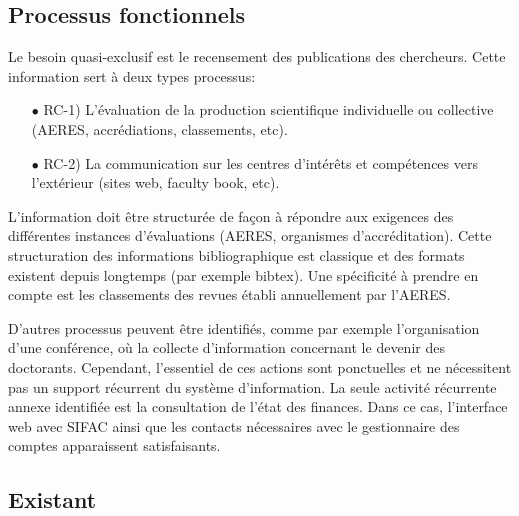 \documentclass{book}
\begin{document}
\subsection{Processus fonctionnels}

Le besoin quasi-exclusif est le recensement des publications des chercheurs.
Cette information sert à deux types processus:
\begin{itemize}
\item[$\bullet$] RC-1) L'évaluation de la production scientifique individuelle ou 
collective (AERES, accrédiations, classements, etc).
\item[$\bullet$] RC-2) La communication sur les centres d'intérêts et compétences 
vers l'extérieur (sites web, faculty book, etc).
\end{itemize}

\bigskip
L'information doit être structurée de façon à répondre aux exigences des 
différentes instances d'évaluations (AERES, organismes d'accréditation).
Cette structuration des informations bibliographique est classique et des
formats existent depuis longtemps (par exemple bibtex). Une spécificité
à prendre en compte est les classements des revues établi annuellement par 
l'AERES.

D'autres processus peuvent être identifiés, comme par exemple l'organisation
d'une conférence, où la collecte d'information concernant le devenir des
doctorants. Cependant, l'essentiel de ces actions sont ponctuelles et ne 
nécessitent pas un support récurrent du système d'information. La seule 
activité récurrente annexe identifiée est la consultation de l'état des 
finances. Dans ce cas, l'interface web avec SIFAC ainsi que les contacts 
nécessaires avec le gestionnaire des comptes apparaissent satisfaisants.



\subsection{Existant}
\end{document}
